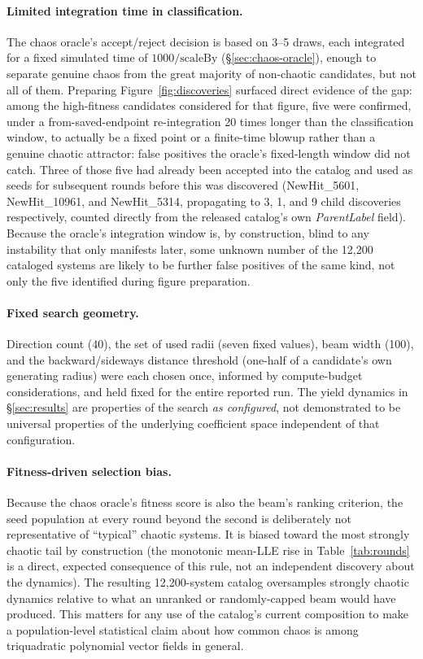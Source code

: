 \documentclass[11pt]{article}
\begin{document}
\paragraph{Limited integration time in classification.} The chaos oracle's
accept/reject decision is based on 3--5 draws, each integrated for a fixed
simulated time of $1000/\mathrm{scaleBy}$ (\S\ref{sec:chaos-oracle}),
enough to separate genuine chaos from the great majority of non-chaotic
candidates, but not all of them. Preparing Figure~\ref{fig:discoveries}
surfaced direct evidence of the gap: among the high-fitness candidates
considered for that figure, five were confirmed, under a
from-saved-endpoint re-integration 20 times longer than the classification
window, to actually be a fixed point or a finite-time blowup rather than a
genuine chaotic attractor: false positives the oracle's fixed-length window did
not catch. Three of those five had already been accepted into the catalog
and used as seeds for subsequent rounds before this was discovered
(NewHit\_5601, NewHit\_10961, and NewHit\_5314, propagating to 3, 1, and 9
child discoveries respectively, counted directly from the released
catalog's own \emph{ParentLabel} field). Because the oracle's integration window
is, by construction, blind to any instability that only manifests later,
some unknown number of the 12{,}200 cataloged systems are likely to be
further false positives of the same kind, not only the five identified
during figure preparation.

\paragraph{Fixed search geometry.} Direction count (40), the set of used
radii (seven fixed values), beam width (100), and the
backward/sideways distance threshold (one-half of a candidate's own
generating radius)
were each chosen once, informed by compute-budget considerations, and held
fixed for the entire reported run. The yield dynamics in
\S\ref{sec:results} are properties of the search \emph{as configured}, not
demonstrated to be universal properties of the underlying coefficient space
independent of that configuration.

\paragraph{Fitness-driven selection bias.} Because the chaos
oracle's fitness score is also the beam's ranking criterion, the seed
population at every round beyond the second is deliberately not
representative of ``typical'' chaotic systems. It is biased toward the most
strongly chaotic tail by construction (the monotonic mean-LLE rise in
Table~\ref{tab:rounds} is a direct, expected consequence of this rule, not an
independent discovery about the dynamics). The resulting 12{,}200-system
catalog oversamples strongly chaotic dynamics relative to what an unranked or
randomly-capped beam would have produced. This matters for any use of the
catalog's current composition to make a population-level statistical claim
about how common chaos is among triquadratic polynomial vector fields in
general.
\end{document}
